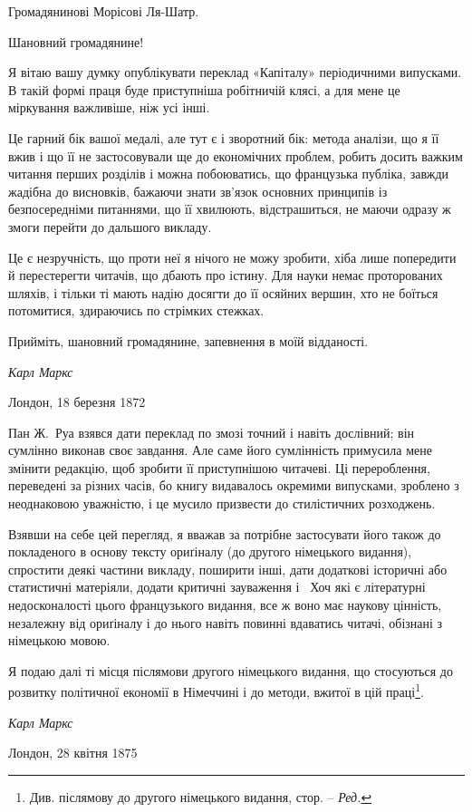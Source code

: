 


\begin{center}
Громадянинові Морісові Ля-Шатр.
\end{center}

Шановний громадянине!

Я вітаю вашу думку опублікувати переклад «Капіталу» періодичними
випусками. В такій формі праця буде приступніша
робітничій клясі, а для мене це міркування важливіше, ніж
усі інші.

Це гарний бік вашої медалі, але тут є і зворотний бік: метода
аналізи, що я її вжив і що її не застосовували ще до економічних
проблем, робить досить важким читання перших розділів і можна
побоюватись, що французька публіка, завжди жадібна до висновків,
бажаючи знати зв’язок основних принципів із безпосередніми
питаннями, що її хвилюють, відстрашиться, не маючи одразу ж
змоги перейти до дальшого викладу.

Це є незручність, що проти неї я нічого не можу зробити, хіба
лише попередити й перестерегти читачів, що дбають про істину.
Для науки немає проторованих шляхів, і тільки ті мають надію
досягти до її осяйних вершин, хто не боїться потомитися, здираючись
по стрімких стежках.

Прийміть, шановний громадянине, запевнення в моїй відданості.

\begin{flushright}
\emph{Карл Маркс}
\end{flushright}

{\small Лондон, 18 березня 1872}


Пан Ж.~Руа взявся дати переклад по змозі точний і навіть
дослівний; він сумлінно виконав своє завдання. Але саме його
сумлінність примусила мене змінити редакцію, щоб зробити її
приступнішою читачеві. Ці перероблення, переведені за різних
часів, бо книгу видавалось окремими випусками, зроблено з
неоднаковою уважністю, і це мусило призвести до стилістичних
розходжень.

Взявши на себе цей перегляд, я вважав за потрібне застосувати
його також до покладеного в основу тексту ориґіналу (до другого
німецького видання), спростити деякі частини викладу, поширити
інші, дати додаткові історичні або статистичні матеріяли, додати
критичні зауваження і~ Хоч які є літературні недосконалості
цього французького видання, все ж воно має наукову цінність,
незалежну від ориґіналу і до нього навіть повинні вдаватись
читачі, обізнані з німецькою мовою.

Я подаю далі ті місця післямови другого німецького видання,
що стосуються до розвитку політичної економії в Німеччині і до
методи, вжитої в цій праці\footnote*{
Див. післямову до другого німецького видання, стор. \pageref{original-81}--\pageref{original-88} \emph{Ред.}
}.

\begin{flushright}
\emph{Карл Маркс}
\end{flushright}

{\small Лондон, 28 квітня 1875~}
